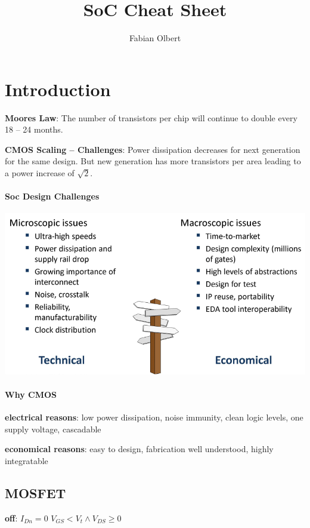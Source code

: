 \documentclass[english]{latex4ei/latex4ei_sheet}
\title{SoC Cheat Sheet}
\author{Fabian Olbert}					%
\begin{document}
\maketitle	%

\section{Introduction}

\textbf{Moores Law}: The number of transistors per chip will continue to double every 18 – 24 months.

\textbf{CMOS Scaling – Challenges}: Power dissipation decreases for next generation for the same design. But new generation has more transistors per area leading to a power increase of $\sqrt{2}$.

\paragraph{Soc Design Challenges}
\begin{center}
  \centering
  \includegraphics[width=0.8\linewidth]{assets/SoCDesignChallenges.png}
  \label{fig:socdesignchallenges}
\end{center}

\paragraph{Why CMOS}
\textbf{electrical reasons}: low power dissipation, noise immunity, clean logic levels, one supply voltage, cascadable

\textbf{economical reasons}: easy to design, fabrication well understood, highly integratable

\subsection{MOSFET}
\textbf{off}: \qquad $I_{Dn} = 0$ \qquad $V_{GS} < V_t \wedge V_{DS} \geq 0$
\end{document}
